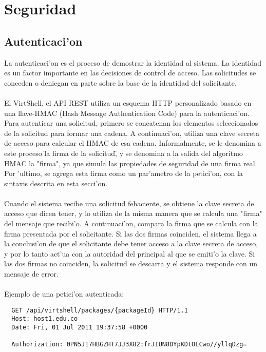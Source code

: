 \chapter{Seguridad}
\label{capseguridad}

\section{Autenticaci'on}
La autenticaci'on es el proceso de demostrar la identidad al sistema. La identidad es un factor importante en las decisiones de control de acceso. Las solicitudes se conceden o deniegan en parte sobre la base de la identidad del solicitante.\\
\\
El VirtShell, el API REST utiliza un esquema HTTP personalizado basado en una llave-HMAC (Hash Message Authentication Code) para la autenticaci'on. Para autenticar una solicitud, primero se concatenan los elementos seleccionados de la solicitud para formar una cadena. A continuaci'on, utiliza una clave secreta de acceso para calcular el HMAC de esa cadena. Informalmente, se le denomina a este proceso \"la firma de la solicitud\", y se denomina a la salida del algoritmo HMAC la "firma", ya que simula las propiedades de seguridad de una firma real. Por 'ultimo, se agrega esta firma como un par'ametro de la petici'on, con la sintaxis descrita en esta secci'on.\\
\\
Cuando el sistema recibe una solicitud fehaciente, se obtiene la clave secreta de acceso que dicen tener, y lo utiliza de la misma manera que se calcula una "firma" del mensaje que recibi'o. A continuaci'on, compara la firma que se calcula con la firma presentada por el solicitante. Si las dos firmas coinciden, el sistema llega a la conclusi'on de que el solicitante debe tener acceso a la clave secreta de acceso, y por lo tanto act'ua con la autoridad del principal al que se emiti'o la clave. Si las dos firmas no coinciden, la solicitud se descarta y el sistema responde con un mensaje de error.\\
\\
Ejemplo de una petici'on autenticada:

\medskip
\begin{lstlisting}
  GET /api/virtshell/packages/{packageId} HTTP/1.1
  Host: host1.edu.co
  Date: Fri, 01 Jul 2011 19:37:58 +0000

  Authorization: 0PN5J17HBGZHT7JJ3X82:frJIUN8DYpKDtOLCwo//yllqDzg= 
\end{lstlisting}

